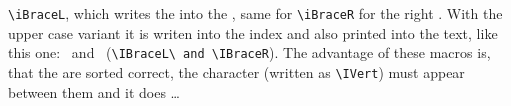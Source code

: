 \documentclass[english]{article}
\providecommand\phantomsection{}
\begin{document}
\verb+\iBraceL+, which writes the \IBraceL{} into the , same for \verb+\iBraceR+ for the right \IBraceR.
With the upper case variant it is writen into the index and also printed into the text,
like this one: \IBraceL\ and \IBraceR\ (\verb|\IBraceL\ and \IBraceR|). The advantage of these macros is, that
the  are sorted correct, the character \IVert{} (written as \verb|\IVert|) must appear between them and it does \ldots

\iVert

\clearpage
\phantomsection
{}
\printindex
\end{document}
